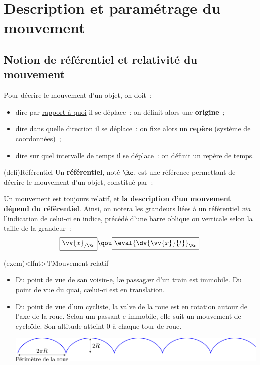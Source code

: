\documentclass[../../main/main.tex]{subfiles}
\begin{document}
\section{Description et paramétrage du mouvement}
\subsection{Notion de référentiel et relativité du mouvement}

Pour décrire le mouvement d'un objet, on doit~:
\begin{itemize}
	\item dire par \underline{rapport à quoi} il se déplace~: on définit alors
	      une \textbf{origine}~;
	\item dire dans \underline{quelle direction} il se déplace~: on fixe alors
	      un \textbf{repère} (système de coordonnées)~;
	\item dire sur \underline{quel intervalle de temps} il se déplace~: on
	      définit un repère de temps.
\end{itemize}

\begin{tcb*}(defi){Référentiel}
	Un \textbf{référentiel}, noté $\Rc$, est une référence permettant de décrire
	le mouvement d'un objet, constitué par~:
\end{tcb*}

Un mouvement est toujours relatif, et \textbf{la description d'un mouvement
	dépend du référentiel}. Ainsi, on notera les grandeurs liées à un référentiel
\textit{via} l'indication de celui-ci en indice, précédé d'une barre oblique ou
verticale selon la taille de la grandeur~:
\[  \boxed{\vv{x}_{/\Rc}}
	\qou
	\boxed{\eval{\dv{\vv{x}}{t}}_{\Rc}}\]

\begin{tcb*}(exem)<lfnt>'l'{Mouvement relatif}
	\begin{itemize}
		\item Du point de vue de san voisin-e, læ passagær d'un train est
		      immobile. Du point de vue du quai, cælui-ci est en translation.
		\item Du point de vue d'um cycliste, la valve de la roue est en rotation
		      autour de l'axe de la roue. Selon um passant-e immobile, elle suit
		      un mouvement de cycloïde. Son altitude atteint $0$ à chaque tour de
		      roue.
		      \begin{center}
			      \includegraphics[width=\linewidth]{roue}
		      \end{center}
	\end{itemize}
\end{tcb*}
\end{document}
